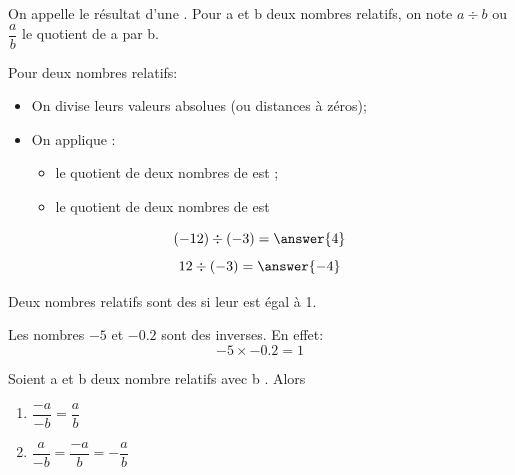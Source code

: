 
\vspace{2cm}
\begin{rappelbox}
    On appelle  le résultat d'une . Pour a et b deux nombres
    relatifs, on note $a\div b$ ou $\dfrac{a}{b}$ le quotient de a par b.
\end{rappelbox}

\begin{propbox}
    Pour  deux nombres relatifs: 
    \begin{itemize}
        \item On divise leurs valeurs absolues (ou distances à zéros);
        \item On applique  :
            \begin{itemize}[label=\textbullet]
                \item le quotient de deux nombres de  est  ;
                \item le quotient de deux nombres de  est 
            \end{itemize}
    \end{itemize}
\end{propbox}

\begin{exemplebox}
    $$ (-12)\div (-3)=\answer{4} $$
    $$ 12\div (-3)=\answer{-4} $$
\end{exemplebox}


\begin{definitionbox}
    Deux nombres relatifs sont des  si leur  est égal à 1.
\end{definitionbox}


\begin{exemplebox}
    Les nombres $-5$ et $-0.2$ sont des inverses. En effet:
    $$-5\times-0.2=1$$
\end{exemplebox}


\begin{propbox}
    Soient a et b deux nombre relatifs avec b . Alors
    \begin{enumerate}
        \item $\dfrac{-a}{-b} = \dfrac{a}{b}$
        \item $\dfrac{a}{-b} = \dfrac{-a}{b} = -\dfrac{a}{b}$
    \end{enumerate}
\end{propbox}
